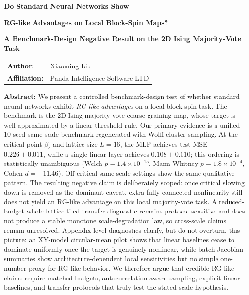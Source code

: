 \documentclass[12pt,a4paper]{memoir}
\begin{document}
\thispagestyle{plain}
\vspace*{2cm}
\begin{center}
    {\LARGE\bfseries Do Standard Neural Networks Show\\}
    {\LARGE\bfseries RG-like Advantages on Local Block-Spin Maps?\par}
    \vspace{1.5cm}

    {\Large\bfseries A Benchmark-Design Negative Result on the 2D Ising Majority-Vote Task\par}
    \vspace{2cm}

    \begin{tabular}{ll}
        \textbf{Author:} & Xiaoming Liu \\
        \textbf{Affiliation:} & Panda Intelligence Software LTD
    \end{tabular}
    \vspace{2cm}

    \parbox{0.9\textwidth}{\small
        \textbf{Abstract:} We present a controlled benchmark-design test of
        whether standard neural networks exhibit \emph{RG-like advantages} on a
        local block-spin task.  The benchmark is the 2D Ising majority-vote
        coarse-graining map, whose target is well approximated by a
        linear-threshold rule.  Our primary evidence is a unified 10-seed
        same-scale benchmark regenerated with Wolff cluster sampling.  At the
        critical point $\beta_c$ and lattice size $L=16$, the MLP achieves test
        MSE $0.226 \pm 0.011$, while a single linear layer achieves
        $0.108 \pm 0.010$; this ordering is statistically unambiguous (Welch
        $p=1.4\times10^{-15}$, Mann-Whitney $p=1.8\times10^{-4}$, Cohen
        $d=-11.46$).  Off-critical same-scale settings show the same qualitative
        pattern.  The resulting negative claim is deliberately scoped: once
        critical slowing down is removed as the dominant caveat, extra fully
        connected nonlinearity still does not yield an RG-like advantage on this
        local majority-vote task.  A reduced-budget whole-lattice tiled transfer
        diagnostic remains protocol-sensitive and does not produce a stable
        monotone scale-degradation law, so cross-scale claims remain unresolved.
        Appendix-level diagnostics clarify, but do not overturn, this picture:
        an XY-model circular-mean pilot shows that linear baselines cease to
        dominate uniformly once the target is genuinely nonlinear, while batch
        Jacobian summaries show architecture-dependent local sensitivities but no
        simple one-number proxy for RG-like behavior.  We therefore argue that
        credible RG-like claims require matched budgets, autocorrelation-aware
        sampling, explicit linear baselines, and transfer protocols that truly
        test the stated scale hypothesis.} 
\end{center}
\clearpage
{}
\tableofcontents
\clearpage
{}
\end{document}
